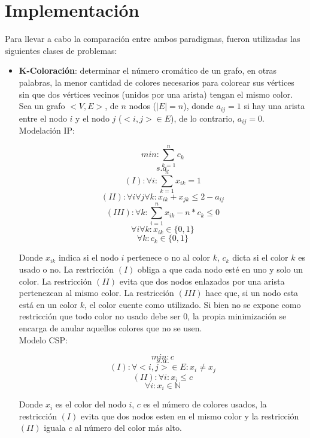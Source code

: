 \documentclass[12pt]{report}
\begin{document}
\chapter{Implementación}

Para llevar a cabo la comparación entre ambos paradigmas, fueron utilizadas las siguientes clases de problemas:
\begin{itemize}
\item \textbf{K-Coloración}: determinar el número cromático de un grafo, en otras palabras, la menor cantidad de colores necesarios para colorear sus vértices sin que dos vértices vecinos (unidos por una arista) tengan el mismo color.\\

Sea un grafo $<V,E>$, de $n$ nodos ($|E|=n$), donde $a_{ij}=1$ si hay una arista entre el nodo $i$ y el nodo $j$ ($<i,j>\in E$), de lo contrario, $a_{ij}=0$.\\

Modelación IP:

$$min: \sum_{k=1}^nc_k$$
$$s.a.$$
$$(I): \forall i: \sum_{k=1}^nx_{ik}=1$$
$$(II): \forall i\forall j \forall k: x_{ik}+x_{jk} \leq 2-a_{ij}$$
$$(III): \forall k: \sum_{i=1}^nx_{ik} -n*c_k\leq 0$$
$$\forall i\forall k: x_{ik}\in\{0,1\}$$
$$\forall k: c_{k}\in\{0,1\}$$

Donde $x_{ik}$ indica si el nodo $i$ pertenece o no al color $k$, $c_k$ dicta si el color $k$ es usado o no. La restricción $(I)$ obliga a que cada nodo esté en uno y solo un color. La restricción $(II)$ evita que dos nodos enlazados por una arista pertenezcan al mismo color. La restricción $(III)$ hace que, si un nodo esta está en un color $k$, el color cuente como utilizado. Si bien no se expone como restricción que todo color no usado debe ser 0, la propia minimización se encarga de anular aquellos colores que no se usen.\\

Modelo CSP:

$$min: c$$
$$s.a.$$
$$(I):\forall <i,j> \in E: x_i\neq x_j$$
$$(II):\forall i: x_i\leq c$$
$$\forall i: x_i\in \mathbb{N}$$

Donde $x_i$ es el color del nodo $i$, $c$ es el número de colores usados, la restricción $(I)$ evita que dos nodos esten en el mismo color y la restricción $(II)$ iguala $c$ al número del color más alto.



\end{itemize}
\end{document}
